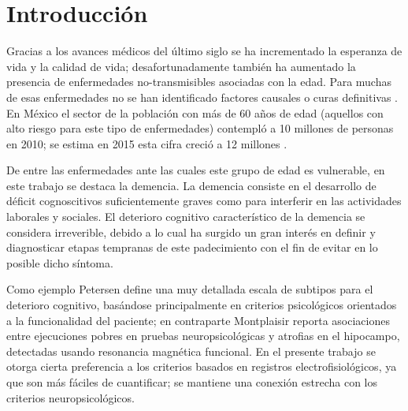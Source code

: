 
\chapter{Introducción}

Gracias a los avances médicos del último siglo se ha incrementado la esperanza de vida y la 
calidad de vida; desafortunadamente también ha aumentado la presencia de enfermedades 
no-transmisibles asociadas con la edad. 
%
Para muchas de esas enfermedades no se han identificado factores causales o curas definitivas 
\cite{PlanAlzheimer04}.
%
En México el sector de la población con más de 60 años de edad (aquellos con alto riesgo para este
tipo de enfermedades) contempló a 10 millones de personas en 2010; se estima en 2015 esta cifra 
creció a 12 millones \cite{Censo10,Intercensal15}.

De entre las enfermedades ante las cuales este grupo de edad es vulnerable, en este trabajo se 
destaca la demencia. 
%
La demencia consiste en el desarrollo de déficit cognoscitivos suficientemente graves como para 
interferir en las actividades laborales y sociales.
%
El deterioro cognitivo característico de la demencia se considera irreverible, debido a lo cual 
ha surgido un gran interés en definir y diagnosticar etapas tempranas de este padecimiento con el 
fin de evitar en lo posible dicho síntoma.

Como ejemplo Petersen \cite{Petersen01} define una muy detallada escala de subtipos para el 
deterioro cognitivo, basándose principalmente en criterios psicológicos orientados a la 
funcionalidad del paciente; en contraparte Montplaisir \cite{Brayet16} reporta asociaciones entre 
ejecuciones pobres en pruebas neuropsicológicas y atrofias en el hipocampo, detectadas usando 
resonancia magnética funcional.
%
En el presente trabajo se otorga cierta preferencia a los criterios basados en registros 
electrofisiológicos, ya que son más fáciles de cuantificar; se mantiene una conexión 
estrecha con los criterios neuropsicológicos.


